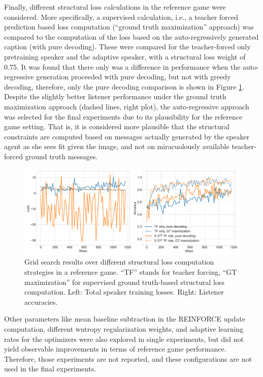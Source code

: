 Finally, different structural loss calculations in the reference game were considered. More specifically, a supervised calculation, i.e., a teacher forced prediction  based loss computation (``ground truth maximization'' approach)  was compared to the computation of the loss based on the auto-regressively generated caption (with pure decoding). These were compared for the teacher-forced only pretraining speaker and the adaptive speaker, with a structural loss weight of 0.75.
It was found that there only was a difference in performance when the auto-regressive generation proceeded with pure decoding, but not with greedy decoding, therefore, only the pure decoding comparison is shown in Figure \ref{fig:coco_grid_Ls_calc}. Despite the slightly better listener performance under the ground truth maximization approach (dashed lines, right plot), the auto-regressive approach was selected for the final experiments due to its plausibility for the reference game setting. That is, it is considered more plausible that the structural constraints are computed based on messages actually generated by the speaker agent as she sees fit given the image, and not on miracuolously available teacher-forced ground truth messages. 

\begin{figure}[h]
	\centering
	\includegraphics[width=\linewidth]{images/grid_search_Ls_calculation.png}
	\caption{Grid search results over different structural loss computation strategies in a reference game. ``TF'' stands for teacher forcing, ``GT maximization'' for supervised ground truth-based structural loss computation. Left: Total speaker training losses. Right: Listener accuracies.}
	\label{fig:coco_grid_Ls_calc}
\end{figure}

Other parameters like mean baseline subtraction in the REINFORCE update computation, different wntropy regularization weights, and adaptive learning rates for the optimizers were also explored in single experiments, but did not yield observable improvements in terms of reference game performance. Therefore, those experiments are not reported, and these configurations are not used in the final experiments.